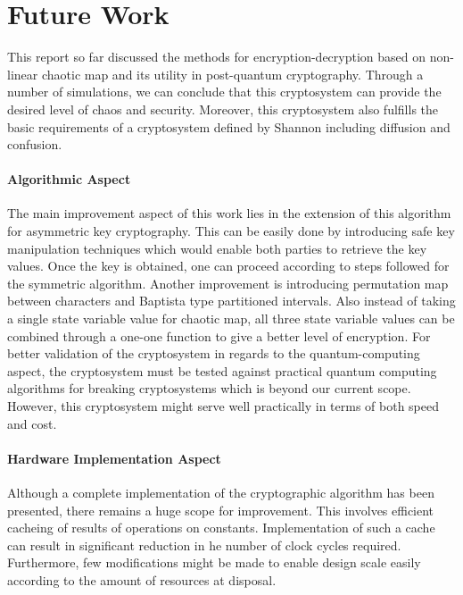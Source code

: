 \chapter{Future Work}
\label{chap:future}
\setlength{\parskip}{1.5mm}
This report so far discussed the methods for encryption-decryption based on non-linear chaotic map and its utility in post-quantum cryptography. Through a number of simulations, we can conclude that this cryptosystem can provide the desired level of chaos and security. Moreover, this cryptosystem also fulfills the basic requirements of a cryptosystem defined by Shannon including diffusion and confusion.
\subsubsection{Algorithmic Aspect}
The main improvement aspect of this work lies in the extension of this algorithm for asymmetric key cryptography. This can be easily done by introducing safe key manipulation techniques which would enable both parties to retrieve the key values. Once the key is obtained, one can proceed according to steps followed for the symmetric algorithm. Another improvement is introducing permutation map between characters and Baptista type partitioned intervals. Also instead of taking a single state variable value for chaotic map, all three state variable values can be combined through a one-one function to give a better level of encryption. For better validation of the cryptosystem in regards to the quantum-computing aspect, the cryptosystem must be tested against practical quantum computing algorithms for breaking cryptosystems which is beyond our current scope. However, this cryptosystem might serve well  practically in terms of both speed and cost.

\subsubsection{Hardware Implementation Aspect}
Although a complete implementation of the cryptographic algorithm has been presented, there remains a huge scope for improvement. This involves efficient cacheing of results of operations on constants. Implementation of such a cache can result in significant reduction in he number of clock cycles required. Furthermore, few modifications might be made to enable design scale easily according to the amount of resources at disposal.
